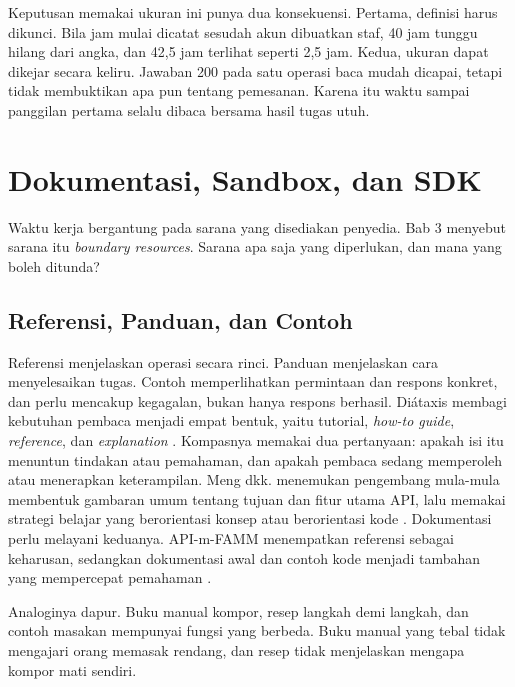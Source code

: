 Keputusan memakai ukuran ini punya dua konsekuensi. Pertama, definisi harus dikunci. Bila jam mulai dicatat sesudah akun
dibuatkan staf, 40 jam tunggu hilang dari angka, dan 42,5 jam terlihat seperti 2,5 jam. Kedua, ukuran dapat dikejar secara
keliru. Jawaban 200 pada satu operasi baca mudah dicapai, tetapi tidak membuktikan apa pun tentang pemesanan. Karena itu
waktu sampai panggilan pertama selalu dibaca bersama hasil tugas utuh.

\section{Dokumentasi, Sandbox, dan SDK}

Waktu kerja bergantung pada sarana yang disediakan penyedia. Bab 3 menyebut sarana itu \textit{boundary resources}. Sarana
apa saja yang diperlukan, dan mana yang boleh ditunda?

\subsection{Referensi, Panduan, dan Contoh}

Referensi menjelaskan operasi secara rinci. Panduan menjelaskan cara menyelesaikan tugas. Contoh memperlihatkan permintaan
dan respons konkret, dan perlu mencakup kegagalan, bukan hanya respons berhasil. Diátaxis membagi kebutuhan pembaca menjadi
empat bentuk, yaitu tutorial, \textit{how-to guide}, \textit{reference}, dan \textit{explanation} \cite{c11-diataxis}.
Kompasnya memakai dua pertanyaan: apakah isi itu menuntun tindakan atau pemahaman, dan apakah pembaca sedang memperoleh
atau menerapkan keterampilan. Meng dkk. menemukan pengembang mula-mula membentuk gambaran umum tentang tujuan dan fitur
utama API, lalu memakai strategi belajar yang berorientasi konsep atau berorientasi kode \cite{c11-meng2018}. Dokumentasi
perlu melayani keduanya. API-m-FAMM menempatkan referensi sebagai keharusan, sedangkan dokumentasi awal dan contoh kode
menjadi tambahan yang mempercepat pemahaman \cite{mathijssen2020}.

Analoginya dapur. Buku manual kompor, resep langkah demi langkah, dan contoh masakan mempunyai fungsi yang berbeda. Buku
manual yang tebal tidak mengajari orang memasak rendang, dan resep tidak menjelaskan mengapa kompor mati sendiri.

